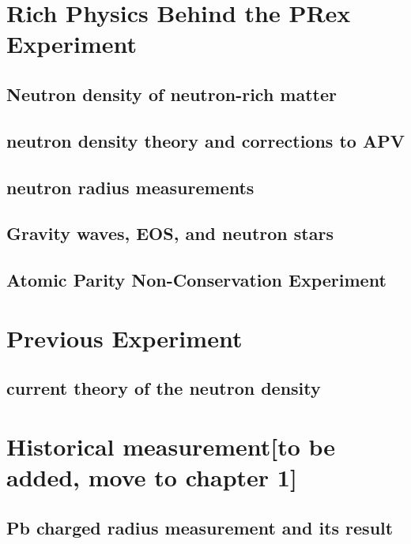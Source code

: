 \section{Rich Physics Behind the PRex Experiment}
\subsection{Neutron density of neutron-rich matter}
\subsection{neutron density theory and corrections to APV}
\subsection{neutron radius measurements}
\subsection{Gravity waves, EOS, and neutron stars}
\subsection{Atomic Parity Non-Conservation Experiment}

\section{Previous Experiment}
\subsection{current theory of the neutron density}

\section{Historical measurement[to be added, move to chapter 1]}
\subsection{Pb charged radius measurement and its result }

